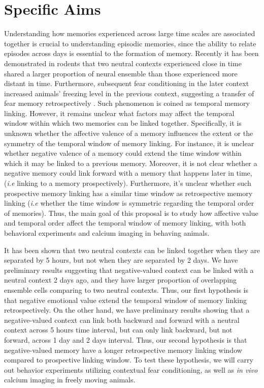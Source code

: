 \documentclass[master.tex]{subfiles}
\begin{document}
\section*{Specific Aims}

Understanding how memories experienced across large time scales are associated
together is crucial to understanding episodic memories, since the ability to
relate episodes across days is essential to the formation of memory. Recently it
has been demonstrated in rodents that two neutral contexts experienced close in
time shared a larger proportion of neural ensemble than those experienced more
distant in time. Furthermore, subsequent fear conditioning in the later context
increased animals' freezing level in the previous context, suggesting a transfer
of fear memory retrospectively \cite{cai_shared_2016}. Such phenomenon is coined
as temporal memory linking. However, it remains unclear what factors may affect
the temporal window within which two memories can be linked together.
Specifically, it is unknown whether the affective valence of a memory influences
the extent or the symmetry of the temporal window of memory linking. For
instance, it is unclear whether negative valence of a memory could extend the
time window within which it may be linked to a previous memory. Moreover, it is
not clear whether a negative memory could link forward with a memory that
happens later in time, (\textit{i.e} linking to a memory prospectively).
Furthermore, it's unclear whether such prospective memory linking has a similar
time window as retrospective memory linking (\textit{i.e} whether the time
window is symmetric regarding the temporal order of memories). Thus, the main
goal of this proposal is to study how affective value and temporal order affect
the temporal window of memory linking, with both behavioral experiments and calcium
imaging in behaving animals.

It has been shown that two neutral contexts can be linked together when they are
separated by 5 hours, but not when they are separated by 2 days. We have
preliminary results suggesting that negative-valued context can be linked with a
neutral context 2 days ago, and they have larger proportion of overlapping
ensemble cells comparing to two neutral contexts. Thus, our first hypothesis is
that negative emotional value extend the temporal window of memory linking
retrospectively. On the other hand, we have preliminary results showing that a
negative-valued context can link both backward and forward with a neutral
context across 5 hours time interval, but can only link backward, but not
forward, across 1 day and 2 days interval. Thus, our second hypothesis is that
negative-valued memory have a longer retrospective memory linking window
compared to prospective linking window. To test these hypothesis, we will carry
out behavior experiments utilizing contextual fear conditioning, as well as
\textit{in vivo} calcium imaging in freely moving animals.
\end{document}
